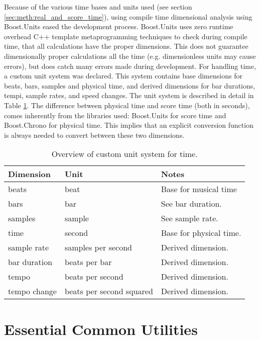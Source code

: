 Because of the various time bases and units used
(see section \ref{sec:meth:real_and_score_time}),
using compile time dimensional analysis using Boost.Units
\cite{BoostUnits}
eased the development process.
Boost.Units uses zero runtime overhead
C++ template metaprogramming techniques \cite{Abrahams2004}
to check during compile time,
that all calculations have the proper dimensions.
This does not guarantee dimensionally proper calculations all the time
(e.g. dimensionless units may cause errors),
but does catch many errors made during development.
For handling time,
a custom unit system was declared.
This system contains base dimensions for
beats, bars, samples and physical time,
and derived dimensions for
bar durations, tempi, sample rates, and speed changes.
The unit system is described in detail in Table \ref{tab:score_units}.
The difference between physical time and score time (both in seconds),
comes inherently from the libraries used:
Boost.Units for score time and Boost.Chrono for physical time.
This implies that an explicit conversion function is always
needed to convert between these two dimensions.

\begin{table}
\begin{center}
\begin{tabular}{ l  l  l }
\toprule
Dimension & Unit & Notes \\
\midrule
beats & beat & Base for musical time \\
bars & bar & See bar duration. \\
samples & sample & See sample rate.\\
time & second & Base for physical time. \\
sample rate & samples per second & Derived dimension. \\
bar duration & beats per bar & Derived dimension. \\
tempo & beats per second & Derived dimension. \\
tempo change & beats per second squared & Derived dimension. \\
\bottomrule
\end{tabular}
\caption{Overview of custom unit system for time.}
\label{tab:score_units}
\end{center}
\end{table}

\section{Essential Common Utilities}

